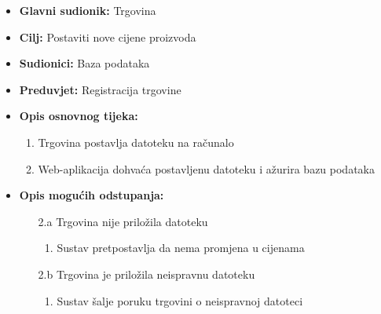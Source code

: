                         \noindent {}
					\begin{itemize}
	
						\item \textbf{Glavni sudionik: }Trgovina
						\item  \textbf{Cilj:} Postaviti nove cijene proizvoda
						\item  \textbf{Sudionici:} Baza podataka
						\item  \textbf{Preduvjet:} Registracija trgovine
						\item  \textbf{Opis osnovnog tijeka:}
						
						\item[] \begin{enumerate}
							\item Trgovina postavlja datoteku na računalo 
                                \item Web-aplikacija dohvaća postavljenu datoteku i ažurira bazu podataka
						\end{enumerate}

                            \item  \textbf{Opis mogućih odstupanja:}
						
						\item[] \begin{enumerate}
	
							\item[2.a] Trgovina nije priložila datoteku
							\item[] \begin{enumerate}
								
								\item Sustav pretpostavlja da nema promjena u cijenama\\
								
							\end{enumerate}
							\item[2.b] Trgovina je priložila neispravnu datoteku
							\item[] \begin{enumerate}
								\item Sustav šalje poruku trgovini o neispravnoj datoteci
							\end{enumerate}
			
							
						\end{enumerate}
						
					\end{itemize}
					
